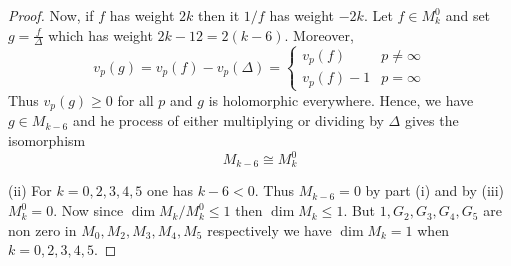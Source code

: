 \documentclass[12pt]{article}
\theoremstyle{definition}
\begin{document}
\begin{proof}
Now, if \(f\) has weight \(2k\) then it \(1/f\) has weight \(-2k\). Let \(f\in M_k^0\) and set \(g = \frac{f}{\Delta }\) which has weight \(2k-12=2(k-6)\). Moreover,
\[
    v_p(g) = v_p(f) - v_p(\Delta )= \begin{cases}
        v_p(f) & p\ne \infty \\
        v_p(f)-1 & p = \infty 
    \end{cases}
\]       
Thus \(v_p(g)\geq 0\) for all \(p\) and \(g\) is holomorphic everywhere. Hence, we have \(g\in M_{k-6}\) and he process of either multiplying or dividing by \(\Delta \) gives the isomorphism
\[
    M_{k-6} \cong M_{k}^0 
\]

(ii) For \(k=0,2,3,4,5\) one has \(k-6<0\). Thus \(M_{k-6}=0\) by part (i) and by (iii) \(M_k^0=0\). Now since \(\dim M_k/M_k^0 \leq 1\) then \(\dim M_k \leq 1\). But \(1,G_2,G_3,G_{4},G_5 \) are non zero in \(M_0,M_2,M_3,M_{4},M_5 \) respectively we have \(\dim M_k =1\) when \(k=0,2,3,4,5\).           
\end{proof}
\end{document}
